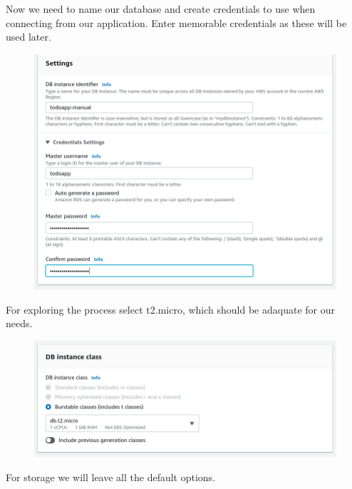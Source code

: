 \documentclass{csse4400}
\begin{document}
Now we need to name our database and create credentials to use when connecting from our application.
Enter memorable credentials as these will be used later.

\begin{figure}[H]
  \includegraphics[width=\textwidth]{images/db3}
\end{figure}

For exploring the process select t2.micro,
which should be adaquate for our needs.


\begin{figure}[H]
  \includegraphics[width=\textwidth]{images/db4}
\end{figure}

For storage we will leave all the default options.
\end{document}
